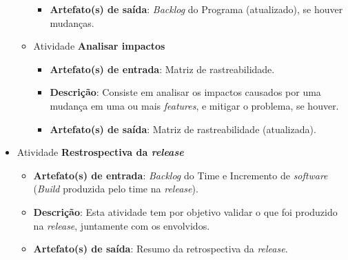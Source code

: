 \begin{itemize}
\begin{itemize}
\begin{itemize}
	      \item \textbf{Artefato(s) de saída}: \textit{Backlog} do Programa (atualizado), se houver mudanças.
		    
	    \end{itemize}
	    
	 \item Atividade \textbf{Analisar impactos}
	    
	    \begin{itemize}
	      \item \textbf{Artefato(s) de entrada}: Matriz de rastreabilidade.

	      \item \textbf{Descrição}: Consiste em analisar os impactos causados por uma mudança em uma ou mais
		\textit{features}, e mitigar o problema, se houver.
	      
	      \item \textbf{Artefato(s) de saída}: Matriz de rastreabilidade (atualizada).
		    
	    \end{itemize}
	    
	\end{itemize}
	
     \item Atividade \textbf{Restrospectiva da \textit{release}}
      
	  \begin{itemize}
	    \item \textbf{Artefato(s) de entrada}: \textit{Backlog} do Time e
	      Incremento de \textit{software} (\textit{Build} produzida pelo time na \textit{release}).
	    
	    \item \textbf{Descrição}: Esta atividade tem por objetivo validar o que foi produzido na \textit{release},
	      juntamente com os envolvidos.
	    
	    \item \textbf{Artefato(s) de saída}: Resumo da retrospectiva da \textit{release}.
		  
	  \end{itemize}
     
    \end{itemize}
